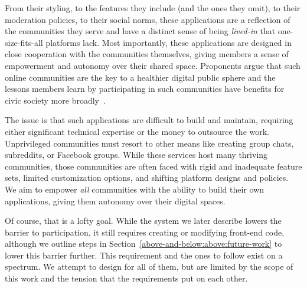 
%
From their styling, to the features they include (and the ones they omit),
to their moderation policies, to their social norms, these applications
are a reflection of the communities they serve and have a
distinct sense of being \emph{lived-in}
that one-size-fits-all platforms lack.
Most importantly, these applications are designed in close cooperation with the communities themselves,
giving members a sense of empowerment and autonomy over their shared space.
Proponents argue that such online communities are the key to a healthier
digital public sphere and the lessons members learn by participating in such
communities have benefits for civic society more broadly~\cite{threeleggedstool, runyourownsocial, archiveoftheirown}.

The issue is that such applications are difficult to build and maintain,
requiring either significant technical expertise or the money to outsource the work.
Unprivileged communities must resort to other means like creating group chats,
subreddits, or Facebook groups. %
While these services host many thriving communities,
those communities are often faced with rigid and inadequate feature sets,
limited customization options, and shifting platform designs and policies.
We aim to empower \emph{all} communities with the ability to
build their own applications, giving them autonomy over their digital spaces.

Of course, that is a lofty goal. While the system
we later describe lowers the barrier to participation,
it still requires creating or modifying front-end code, although
we outline steps in Section~\ref{above-and-below:above:future-work}
to lower this barrier further.
This requirement and the ones to follow exist on a spectrum.
We attempt to design for all of them, but are limited by
the scope of this work and the tension that the requirements put
on each other.




